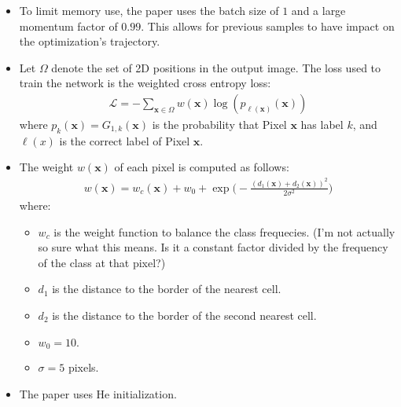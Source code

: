 \documentclass[10pt]{article}
\newcommand{\ve}[1]{\mathbf{#1}}
\begin{document}
  \begin{itemize}
  	\item To limit memory use, the paper uses the batch size of $1$ and a large momentum factor of $0.99$. This allows for previous samples to have impact on the optimization's trajectory.

  	\item Let $\Omega$ denote the set of 2D positions in the output image. The loss used to train the network is the weighted cross entropy loss:
  	\begin{align*}
  		\mathcal{L} = -\sum_{\ve{x} \in \Omega} w(\ve{x}) \log(p_{\ell(\ve{x})} (\ve{x}))
  	\end{align*}
  	where $p_k(\ve{x}) = G_{1,k}(\ve{x})$ is the probability that Pixel $\ve{x}$ has label $k$, and $\ve{\ell}(x)$ is the correct label of Pixel $\ve{x}$.

  	\item The weight $w(\ve{x})$ of each pixel is computed as follows:
  	\begin{align*}
  		w(\ve{x}) = w_c(\ve{x}) + w_0 + \exp \bigg( -\frac{(d_1(\ve{x}) + d_2(\ve{x}))^2}{2\sigma^2} \bigg)
  	\end{align*}
  	where:
  	\begin{itemize}
  		\item $w_c$ is the weight function to balance the class frequecies. (I'm not actually so sure what this means. Is it a constant factor divided by the frequency of the class at that pixel?)

  		\item $d_1$ is the distance to the border of the nearest cell.
  		
  		\item $d_2$ is the distance to the border of the second nearest cell.

  		\item $w_0 = 10.$

  		\item $\sigma = 5$ pixels.
  	\end{itemize}  	

  	\item The paper uses He initialization.
  \end{itemize}

  
    
  	
\end{document}
